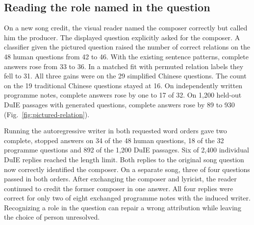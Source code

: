 \subsection*{Reading the role named in the question}
On a new song credit, the visual reader named the composer correctly but called him the producer. The displayed question explicitly asked for the composer. A classifier given the pictured question raised the number of correct relations on the 48 human questions from 42 to 46. With the existing sentence patterns, complete answers rose from 33 to 36. In a matched fit with permuted relation labels they fell to 31. All three gains were on the 29 simplified Chinese questions. The count on the 19 traditional Chinese questions stayed at 16. On independently written programme notes, complete answers rose by one to 17 of 32. On 1,200 held-out DuIE passages with generated questions, complete answers rose by 89 to 930 (Fig.~\ref{fig:pictured-relation}).

Running the autoregressive writer in both requested word orders gave two complete, stopped answers on 34 of the 48 human questions, 18 of the 32 programme questions and 892 of the 1,200 DuIE passages. Six of 2,400 individual DuIE replies reached the length limit. Both replies to the original song question now correctly identified the composer. On a separate song, three of four questions passed in both orders. After exchanging the composer and lyricist, the reader continued to credit the former composer in one answer. All four replies were correct for only two of eight exchanged programme notes with the induced writer. Recognizing a role in the question can repair a wrong attribution while leaving the choice of person unresolved.
